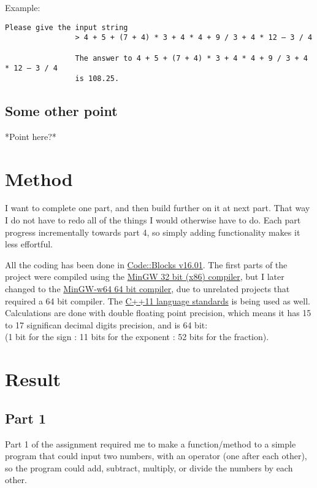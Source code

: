 \documentclass{article}
\begin{document}
			Example:
			\begin{lstlisting}[numbers=none]
				Please give the input string
				> 4 + 5 + (7 + 4) * 3 + 4 * 4 + 9 / 3 + 4 * 12 – 3 / 4
				
				The answer to 4 + 5 + (7 + 4) * 3 + 4 * 4 + 9 / 3 + 4 * 12 – 3 / 4
				is 108.25.
			\end{lstlisting}
		\subsection{Some other point}
			*Point here?*
	
	
	\section{Method}
		I want to complete one part, and then build further on it at next part. That way I do not have to redo all of the things I would otherwise have to do. Each part progress incrementally towards part 4, so simply adding functionality makes it less effortful.
		
		All the coding has been done in
		\href{http://www.codeblocks.org/}{Code::Blocks v16.01}.
		The first parts of the project were compiled using the \href{https://sourceforge.net/projects/mingw/files/}{MinGW 32 bit (x86) compiler}, but I later changed to the \href{https://sourceforge.net/projects/mingw-w64/}{MinGW-w64 64 bit compiler}, due to unrelated projects that required a 64 bit compiler.
		The \href{http://www.stroustrup.com/C++11FAQ.html}{C++11 language standards} is being used as well.
		Calculations are done with double floating point precision, which means it has 15 to 17 significan decimal digits precision, and is 64 bit: \\
		(1 bit for the sign : 11 bits for the exponent : 52 bits for the fraction). \cite{doubleArithmetic} \cite{wikiDouble}
	
	
	\section{Result}
		\subsection{Part 1}
			Part 1 of the assignment required me to make a function/method to a simple program that could input two numbers, with an operator (one after each other), so the program could add, subtract, multiply, or divide the numbers by each other.
			
\end{document}
